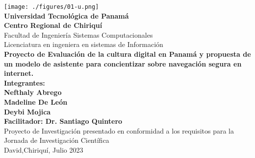 \documentclass[12pt,letterpaper,fleqn]{report}
\begin{document}
\pagestyle{empty}
\begin{center}
    \parbox[c][\textheight][t]{\textwidth}{
        \begin{center}
            \texttt{[image: ./figures/01-u.png]}\\
            \vspace{0.25cm}
           {\normalsize \bf Universidad Tecnológica de Panamá}\\ \vspace{-0.15cm} 
                {\normalsize \bf Centro Regional de Chiriquí}\\ \vspace{-0.10cm}
            {\normalsize Facultad de Ingeniería Sistemas Computacionales}\\ \vspace{-0.15cm} 
            {\normalsize Licenciatura en ingeniera en sistemas de Información}\\
            \vspace{2cm}
            {\normalsize \bf Proyecto de Evaluación de la cultura digital en Panamá y propuesta de un modelo de asistente para concientizar sobre navegación segura en internet.} \\
            \vspace{2cm}
            {\normalsize \bf Integrantes: } \\
            {\normalsize \bf Nefthaly Abrego } \\
            {\normalsize \bf Madeline De León} \\
            {\normalsize \bf Deybi Mojica    } \\ 
             \vspace{2cm}
            {\normalsize \bf Facilitador: Dr. Santiago Quintero} \\
            \vfill
            Proyecto de Investigación presentado en conformidad a los requisitos para la Jornada de Investigación Científica \\
            \vspace{0.5cm}
            David,Chiriquí,  Julio 2023
        \end{center}
        }
\end{center}


\cleardoublepage
\end{document}
